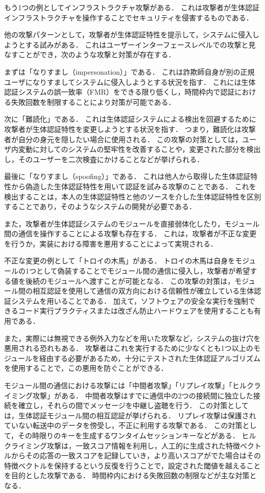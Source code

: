 もう1つの例としてインフラストラクチャ攻撃がある．
これは攻撃者が生体認証インフラストラクチャを操作することでセキュリティを侵害するものである．

他の攻撃パターンとして，攻撃者が生体認証特性を提示して，システムに侵入しようとする試みがある．
これはユーザーインターフェースレベルでの攻撃と見なすことができ，次のような攻撃と対策が存在する．

まずは「なりすまし（impersonation）」である．
これは詐欺師自身が別の正規ユーザになりすましてシステムに侵入しようとする状況を指す．
これには生体認証システムの誤一致率（FMR）をできる限り低くし，時間枠内で認証における失敗回数を制限することにより対策が可能である．

次に「難読化」である．
これは生体認証システムによる検出を回避するために攻撃者が生体認証特性を変更しようとする状況を指す．
つまり，難読化は攻撃者が自分の身元を隠したい場合に使用される．
この攻撃の対策としては，ユーザ内変動に対してのシステムの堅牢性を改善することや，変更された部分を検出し，そのユーザーを二次検査にかけることなどが挙げられる．

最後に「なりすまし（spoofing）」である．
これは他人から取得した生体認証特性から偽造した生体認証特性を用いて認証を試みる攻撃のことである．
これを検出することは，本人の生体認証特性と他のソースを介した生体認証特性を区別することであり，そのようなシステムの開発が必要である．

また，攻撃者が生体認証システムのモジュールを直接弱体化したり，モジュール間の通信を操作することによる攻撃も存在する．
これは，攻撃者が不正な変更を行うか，実装における障害を悪用することによって実現される．

不正な変更の例として「トロイの木馬」がある．
トロイの木馬は自身をモジュールの1つとして偽装することでモジュール間の通信に侵入し，攻撃者が希望する値を後続のモジュールへ渡すことが可能となる．
この攻撃の対策は，モジュール間の相互認証を使用して通信の双方向における信頼性が確立している生体認証システムを用いることである．
加えて，ソフトウェアの安全な実行を強制できるコード実行プラクティスまたは改ざん防止ハードウェアを使用することも有用である．

また，実際には無視できる例外入力などを用いた攻撃など，システムの抜け穴を悪用される恐れもある．
攻撃者はこれを実行するために少なくとも1つ以上のモジュールを経由する必要があるため，十分にテストされた生体認証アルゴリズムを使用することで，この悪用を防ぐことができる．

モジュール間の通信における攻撃には「中間者攻撃」「リプレイ攻撃」「ヒルクライミング攻撃」がある．
中間者攻撃はすでに通信中の2つの接続間に独立した接続を確立し，それらの間でメッセージを中継し盗聴を行う．
この対策としては，生体認証モジュール間の相互認証が挙げられる．
リプレイ攻撃は保護されていない転送中のデータを傍受し，不正に利用する攻撃である．
この対策として，その時限りのキーを生成するワンタイムセッションキーなどがある．
ヒルクライミング攻撃は，一致スコア情報を利用し，人工的に生成された特徴ベクトルからその応答の一致スコアを記録していき，より高いスコアがでた場合はその特徴ベクトルを保持するという反復を行うことで，設定された閾値を越えることを目的とした攻撃である．
時間枠内における失敗回数の制限などが主な対策となる．

